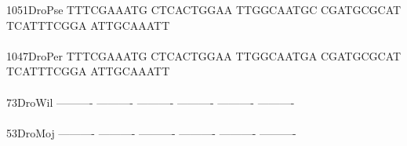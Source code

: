\documentclass[11pt,twoside,reqno,a4paper]{article}
\begin{document}
{1051\hspace*{1\charwidth}DroPse	TTTCGAAATG	CTCACTGGAA	TTGGCAATGC	CGATGCGCAT	TCATTTCGGA	ATTGCAAATT	\\
\hspace*{5\charwidth}\hspace*{7\charwidth}\hspace*{1\charwidth}\hspace*{1\charwidth}\hspace*{1\charwidth}\hspace*{1\charwidth}\hspace*{1\charwidth}\hspace*{1\charwidth}\\
1047\hspace*{1\charwidth}DroPer	TTTCGAAATG	CTCACTGGAA	TTGGCAATGA	CGATGCGCAT	TCATTTCGGA	ATTGCAAATT	\\
\hspace*{5\charwidth}\hspace*{7\charwidth}\hspace*{1\charwidth}\hspace*{1\charwidth}\hspace*{1\charwidth}\hspace*{1\charwidth}\hspace*{1\charwidth}\hspace*{1\charwidth}\\
73\hspace*{3\charwidth}DroWil	----------	----------	----------	----------	----------	----------	\\
\hspace*{5\charwidth}\hspace*{7\charwidth}\hspace*{1\charwidth}\hspace*{1\charwidth}\hspace*{1\charwidth}\hspace*{1\charwidth}\hspace*{1\charwidth}\hspace*{1\charwidth}\\
53\hspace*{3\charwidth}DroMoj	----------	----------	----------	----------	----------	----------	\\
\hspace*{5\charwidth}\hspace*{7\charwidth}\hspace*{1\charwidth}\hspace*{1\charwidth}\hspace*{1\charwidth}\hspace*{1\charwidth}\hspace*{1\charwidth}\hspace*{1\charwidth}\\
}
\end{document}
